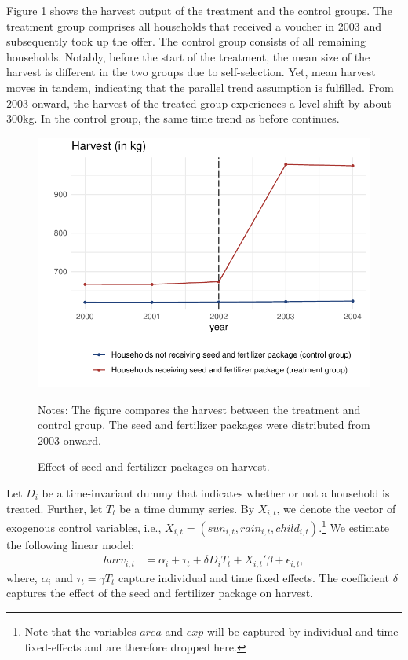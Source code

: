 Figure \ref{fig:did_a} shows the harvest output of the treatment and the control groups. The treatment group comprises all households that received a voucher in 2003 and subsequently took up the offer. The control group consists of all remaining households. Notably, before the start of the treatment, the mean size of the harvest is different in the two groups due to self-selection. Yet, mean harvest moves in tandem, indicating that the parallel trend assumption is fulfilled. From 2003 onward, the harvest of the treated group experiences a level shift by about 300kg. In the control group, the same time trend as before continues.

\begin{figure}[htb]
	\begin{center}
		\includegraphics[width=0.55\linewidth]{../figures/part5a.pdf}
	\end{center}
	\caption{Effect of seed and fertilizer packages on harvest.}
	\label{fig:did_a}	{\footnotesize Notes: The figure compares the harvest between the treatment and control group. The seed and fertilizer packages were distributed from 2003 onward.}
\end{figure}


Let $D_i$ be a time-invariant dummy that indicates whether or not a household is treated. Further, let $T_t$ be a time dummy series. By $X_{i,t}$, we denote the vector of exogenous control variables, i.e., $X_{i,t} = \left(sun_{i,t}, rain_{i,t}, child_{i,t}\right)$.\footnote{Note that the variables $area$ and $exp$ will be captured by individual and time fixed-effects and are therefore dropped here.}
We estimate the following linear model:
\begin{align}
	\label{eq:eq7did}
	harv_{i,t} &= \alpha_i + \tau_t + \delta D_{i} T_t + X_{i,t}'\beta + \epsilon_{i,t},
\end{align}
where, $\alpha_i$ and $\tau_t = \gamma T_t$ capture individual and time fixed effects. The coefficient $\delta$ captures the effect of the seed and fertilizer package on harvest. 

